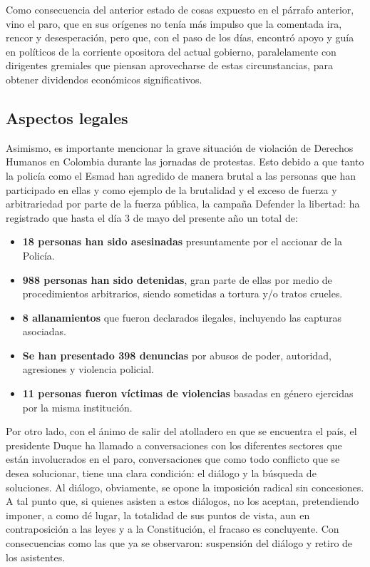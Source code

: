 \documentclass[doc, 12pt, letterpaper, donotrepeattitle, floatsintext, apacite]{apa6}    %
\begin{document}
Como consecuencia del anterior estado de cosas expuesto en el párrafo anterior, vino el paro, que en sus orígenes no tenía más impulso que la comentada ira, rencor y desesperación, pero que, con el paso de los días, encontró apoyo y guía en políticos de la corriente opositora del actual gobierno, paralelamente con dirigentes gremiales que piensan aprovecharse de estas circunstancias, para obtener dividendos económicos significativos.

\subsection{Aspectos legales}
Asimismo, es importante mencionar la grave situación de violación de Derechos Humanos en Colombia durante las jornadas de protestas. Esto debido a que tanto la policía como el Esmad han agredido de manera brutal a las personas que han participado en ellas y como ejemplo de la brutalidad y el exceso de fuerza y arbitrariedad por parte de la fuerza pública, la campaña Defender la libertad: ha registrado que hasta el día 3 de mayo del presente año un total de:
\begin{itemize}
    \item \textbf{18 personas han sido asesinadas} presuntamente por el accionar de la Policía.
    \item \textbf{988 personas han sido detenidas}, gran parte de ellas por medio de procedimientos arbitrarios, siendo sometidas a tortura y/o tratos crueles.
    \item \textbf{8 allanamientos} que fueron declarados ilegales, incluyendo las capturas asociadas.
    \item \textbf{Se han presentado 398 denuncias} por abusos de poder, autoridad, agresiones y violencia policial.
    \item \textbf{11 personas fueron víctimas de violencias} basadas en género ejercidas por la misma institución.
\end{itemize}


Por otro lado, con el ánimo de salir del atolladero en que se encuentra el país, el presidente Duque ha llamado a conversaciones con los diferentes sectores que están involucrados en el paro, conversaciones que como todo conflicto que se desea solucionar, tiene una clara condición: el diálogo y la búsqueda de soluciones. Al diálogo, obviamente, se opone la imposición radical sin concesiones. A tal punto que, si quienes asisten a estos diálogos, no los aceptan, pretendiendo imponer, a como dé lugar, la totalidad de sus puntos de vista, aun en contraposición a las leyes y a la Constitución, el fracaso es concluyente. Con consecuencias como las que ya se observaron: suspensión del diálogo y retiro de los asistentes.
\end{document}

